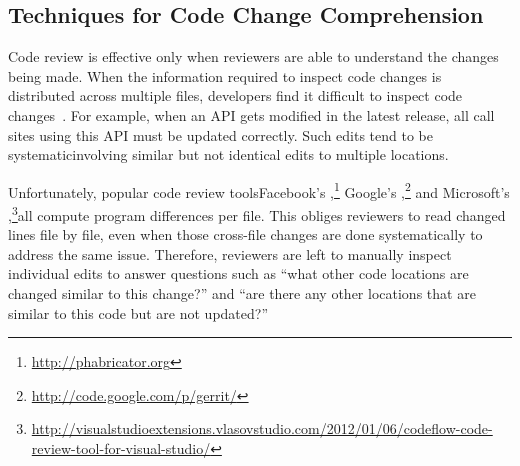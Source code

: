 \documentclass[runningheads,a4paper]{llncs}
\begin{document}

\subsection{Techniques for Code Change Comprehension} 

Code review is effective only when reviewers are able to understand the changes being made. When the information required to inspect code changes is distributed across multiple files, developers find it difficult to inspect code changes~\cite{dunsmore2000object}. For example, when an API gets modified in the latest release, all call sites using this API must be updated correctly. Such edits tend to be systematic\textemdash involving similar but not identical edits to multiple locations.



Unfortunately, popular code review tools\textemdash Facebook's {\phabricator},\footnote{\url{http://phabricator.org}} Google's {\gerrit},\footnote{\url{http://code.google.com/p/gerrit/}} and Microsoft's {\codeflow},\footnote{\url{http://visualstudioextensions.vlasovstudio.com/2012/01/06/codeflow-code-review-tool-for-visual-studio/}}\textemdash all compute program differences per file. This obliges reviewers to read changed lines file by file, even when those cross-file changes are done systematically to address the same issue. Therefore, reviewers are left to manually inspect individual edits to answer questions such as ``what other code locations are changed similar to this change?'' and ``are there any other locations that are similar to this code but are not updated?''
\end{document}

